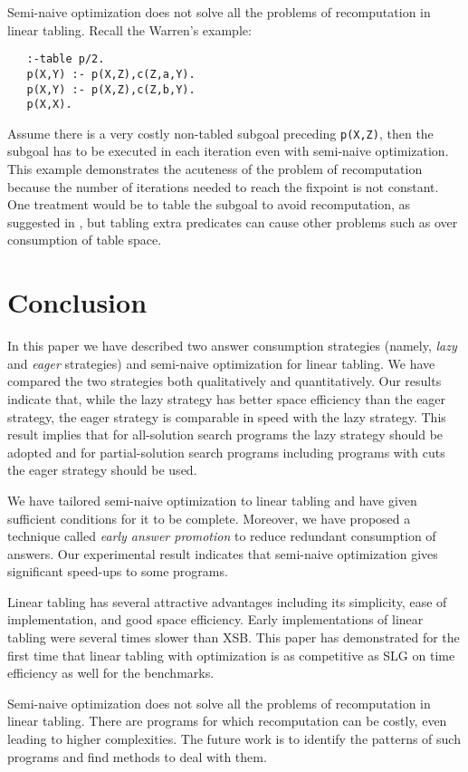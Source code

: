 \documentclass{tlp}
\begin{document}
Semi-naive optimization does not solve all the problems of recomputation in linear tabling. Recall the Warren's example:
\begin{verbatim}
   :-table p/2.
   p(X,Y) :- p(X,Z),c(Z,a,Y).
   p(X,Y) :- p(X,Z),c(Z,b,Y).
   p(X,X).
\end{verbatim}
Assume there is a very costly non-tabled subgoal preceding {\tt p(X,Z)}, then the subgoal has to be executed in each iteration even with semi-naive optimization. This example demonstrates the acuteness of the problem of recomputation because the number of iterations needed to reach the fixpoint is not constant. One treatment would be to table the subgoal to avoid recomputation, as suggested in \cite{Guo01}, but tabling extra predicates can cause other problems such as over consumption of table space.

\section{Conclusion}
In this paper we have described two answer consumption strategies (namely, {\it lazy} and {\it eager} strategies) and semi-naive optimization for linear tabling. We have compared the two strategies both qualitatively and quantitatively. Our results indicate that, while the lazy strategy has better space efficiency than the eager strategy, the eager strategy is comparable in speed with the lazy strategy. This result implies that for all-solution search programs the lazy strategy should be adopted and for partial-solution search programs including programs with cuts the eager strategy should be used.

We have tailored semi-naive optimization to linear tabling and have given sufficient conditions for it to be complete. Moreover, we have proposed a technique called {\it early answer promotion} to reduce redundant consumption of answers. Our experimental result indicates that semi-naive optimization gives significant speed-ups to some programs.

Linear tabling has several attractive advantages including its simplicity, ease of implementation, and good space efficiency. Early implementations of linear tabling were several times slower than XSB. This paper has demonstrated for the first time that linear tabling with optimization is as competitive as SLG on time efficiency as well for the benchmarks. 

Semi-naive optimization does not solve all the problems of recomputation in linear tabling. There are programs for which recomputation can be costly, even leading to higher complexities. The future work is to identify the patterns of such programs and find methods to deal with them.
\end{document}
